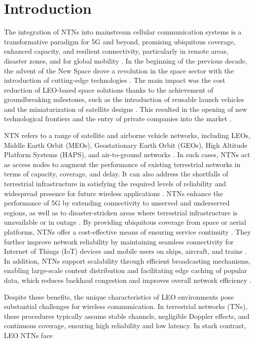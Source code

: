 \documentclass[conference]{IEEEtran}
\begin{document}
\section{Introduction}
\label{sec:introduction}

The integration of NTNs into mainstream cellular communication systems is a transformative paradigm for 5G and beyond, promising ubiquitous coverage, enhanced capacity, and resilient connectivity, particularly in remote areas, disaster zones, and for global mobility \cite{Ref1}.
In the beginning of the previous decade, the advent of the New Space drove a revolution in the space sector with the introduction of cutting-edge technologies \cite{Ref1a}. The main impact was the cost reduction of LEO-based space solutions thanks to the achievement of groundbreaking milestones, such as the introduction of reusable launch vehicles \cite{Ref2a} and the miniaturization of satellite designs \cite{Ref3a}. This resulted in the opening of new technological frontiers and the entry of private companies into the market \cite{Refa}.

 NTN refers to a range of satellite and airborne vehicle networks, including LEOs, Middle Earth Orbit (MEOs), Geostationary Earth Orbit (GEOs), High Altitude Platform Systems (HAPS), and air-to-ground networks \cite{Ref6y}. In such cases, NTNs act as access nodes to augment the performance of existing terrestrial networks in terms of capacity, coverage, and delay. It can also address the shortfalls of terrestrial infrastructure in satisfying the required levels of reliability and widespread presence for future wireless applications \cite{Refz}. NTNs enhance the performance of 5G by extending connectivity to unserved and underserved regions, as well as to disaster-stricken areas where terrestrial infrastructure is unavailable or in outage \cite{Refz}. By providing ubiquitous coverage from space or aerial platforms, NTNs offer a cost-effective means of ensuring service continuity \cite{Refz}. They further improve network reliability by maintaining seamless connectivity for Internet of Things (IoT) devices and mobile users on ships, aircraft, and trains \cite{Refz}. In addition, NTNs support scalability through efficient broadcasting mechanisms, enabling large-scale content distribution and facilitating edge caching of popular data, which reduces backhaul congestion and improves overall network efficiency \cite{Refz}.

Despite these benefits, the unique characteristics of LEO environments pose substantial challenges for wireless communication. In terrestrial networks (TNs), these procedures typically assume stable channels, negligible Doppler effects, and continuous coverage, ensuring high reliability and low latency. In stark contrast, LEO NTNs face
\end{document}
